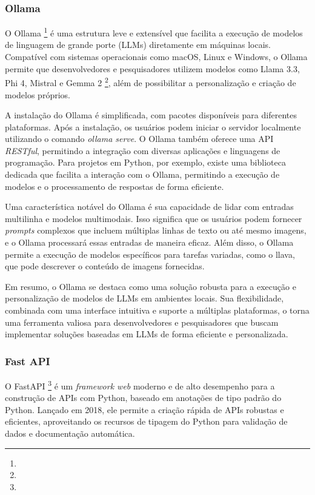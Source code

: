 \documentclass[a4paper, 12pt]{article}
\begin{document}
    \subsubsection{Ollama} \label{sec:ollama}

    O Ollama \footnote{} é uma estrutura leve e extensível que facilita a execução de modelos de linguagem de grande porte (LLMs) diretamente em máquinas locais. Compatível com sistemas operacionais como macOS, Linux e Windows, o Ollama permite que desenvolvedores e pesquisadores utilizem modelos como Llama 3.3, Phi 4, Mistral e Gemma 2 \footnote{}, além de possibilitar a personalização e criação de modelos próprios.

    A instalação do Ollama é simplificada, com pacotes disponíveis para diferentes plataformas. Após a instalação, os usuários podem iniciar o servidor localmente utilizando o comando \textit{ollama serve}. O Ollama também oferece uma API \textit{RESTful}, permitindo a integração com diversas aplicações e linguagens de programação. Para projetos em Python, por exemplo, existe uma biblioteca dedicada que facilita a interação com o Ollama, permitindo a execução de modelos e o processamento de respostas de forma eficiente.

    Uma característica notável do Ollama é sua capacidade de lidar com entradas multilinha e modelos multimodais. Isso significa que os usuários podem fornecer \textit{prompts} complexos que incluem múltiplas linhas de texto ou até mesmo imagens, e o Ollama processará essas entradas de maneira eficaz. Além disso, o Ollama permite a execução de modelos específicos para tarefas variadas, como o llava, que pode descrever o conteúdo de imagens fornecidas.

    Em resumo, o Ollama se destaca como uma solução robusta para a execução e personalização de modelos de LLMs em ambientes locais. Sua flexibilidade, combinada com uma interface intuitiva e suporte a múltiplas plataformas, o torna uma ferramenta valiosa para desenvolvedores e pesquisadores que buscam implementar soluções baseadas em LLMs de forma eficiente e personalizada.

    \subsubsection{Fast API} \label{sec:fastapi}

    O FastAPI \footnote{} é um \textit{framework web} moderno e de alto desempenho para a construção de APIs com Python, baseado em anotações de tipo padrão do Python. Lançado em 2018, ele permite a criação rápida de APIs robustas e eficientes, aproveitando os recursos de tipagem do Python para validação de dados e documentação automática.
\end{document}
